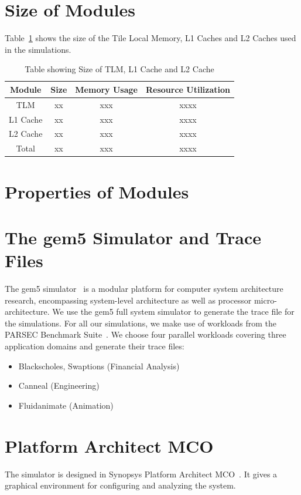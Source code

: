 \documentclass{listhesis}
\begin{document}
\section{Size of Modules}
Table~\ref{table:Size} shows the size of the Tile Local Memory, L1 Caches and L2 Caches used in the simulations. 
\begin{table}[h!]
\begin{center}
 \begin{tabular}{||c c c c||} 
 \hline
 Module & Size & Memory Usage   & Resource Utilization \\ [0.5 ex] 
 \hline\hline
 TLM & xx & xxx & xxxx \\ 
 \hline
 L1 Cache & xx & xxx & xxxx \\
 \hline
 L2 Cache & xx & xxx & xxxx \\
 \hline\hline
 Total  & xx & xxx & xxxx \\
  \hline
\end{tabular}
 \caption{Table showing Size of TLM, L1 Cache and L2 Cache}
 \label{table:Size}
\end{center}
\end{table}
\section{Properties of Modules}
\section{The gem5 Simulator and Trace Files}
The gem5 simulator~\cite{gem5} is a modular platform for computer system architecture research, encompassing system-level architecture as well as processor micro-architecture. We use the gem5 full system simulator to generate the trace file for the simulations. For all our simulations, we make use of workloads from the PARSEC Benchmark Suite~\cite{lispaper}. We choose four parallel workloads covering three application domains and generate their trace files:
\begin{itemize}
\item Blackscholes, Swaptions (Financial Analysis)
\item Canneal (Engineering)
\item Fluidanimate (Animation)
\end{itemize}
\section{Platform Architect MCO}
The simulator is designed in Synopsys Platform Architect MCO~\cite{synopsys}. It gives a graphical environment for configuring and analyzing the system. 
\end{document}
